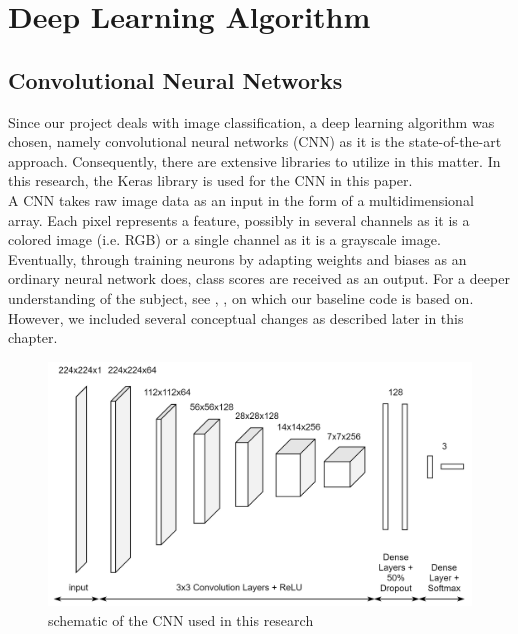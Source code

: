 \section{Deep Learning Algorithm}
\subsection{Convolutional Neural Networks}
Since our project deals with image classification, a deep learning algorithm was chosen, namely convolutional neural networks (CNN) as it is the state-of-the-art approach.\cite{szegedy2015going} Consequently, there are extensive libraries to utilize in this matter. In this research, the Keras library is used for the CNN in this paper.\\
A CNN takes raw image data as an input in the form of a multidimensional array. Each pixel represents a feature, possibly in several channels as it is a colored image (i.e. RGB) or a single channel as it is a grayscale image. Eventually, through training neurons by adapting weights and biases as an ordinary neural network does, class scores are received as an output. For a deeper understanding of the subject, see \cite{bloem2020deeplearning1}, \cite{karpathy2016convolutional}, on which our baseline code is based on. However, we included several conceptual changes as described later in this chapter.

\begin{figure}[h]
  \centering
  \includegraphics[width=\linewidth]{figures/cnn.png}
  \caption{schematic of the CNN used in this research}
\end{figure}

